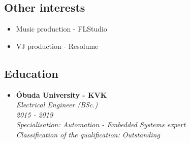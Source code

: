 \documentclass[11pt,oneslide,a4paper,titlepage]{article}
\begin{document}
\begin{tcolorbox}
\begin{minipage}[t]{8cm}
\begin{tcolorbox}[grow to left by=0.6cm,colback=gray!25,colframe=white]
			\section*{Other interests}
			\begin{itemize}
				\item{Music production - FLStudio}
				\item{VJ production - Resolume	}
			\end{itemize}													
		\end{tcolorbox}
	\end{minipage}
	\begin{minipage}[t]{11cm}
		\vspace*{-0.5cm}
		\begin{tcolorbox}[grow to right by=0.75cm,colframe=white,colback=white]
			\section*{Education}
			\begin{itemize}
				\item{
					\textbf{Óbuda University - KVK} \\
					\emph{Electrical Engineer (BSc.)} \\
					\emph{2015 - 2019} \\
					\emph{Specialisation: Automation - Embedded Systems expert} \\
					\emph{Classification of the qualification: Outstanding}
				}
			\end{itemize}

\end{tcolorbox}
\end{minipage}
\end{tcolorbox}
\end{document}

